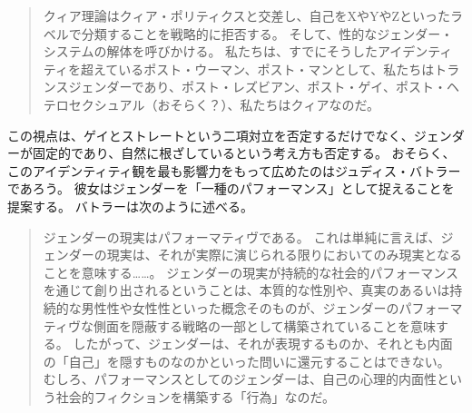 \documentclass[paper=a4,book,openany]{jlreq} \usepackage{mystyle}
\begin{document}
\begin{quote}
クィア理論はクィア・ポリティクスと交差し、自己をXやYやZといったラベルで分類することを戦略的に拒否する。
そして、性的なジェンダー・システムの解体を呼びかける。
私たちは、すでにそうしたアイデンティティを超えている{\DDASH}ポスト・ウーマン、ポスト・マンとして、私たちはトランスジェンダーであり、ポスト・レズビアン、ポスト・ゲイ、ポスト・ヘテロセクシュアル（おそらく？）、私たちはクィアなのだ。
\citep[p.38]{richardson00:_rethin_sexual}
\end{quote}

この視点は、ゲイとストレートという二項対立を否定するだけでなく、ジェンダーが固定的であり、自然に根ざしているという考え方も否定する。
おそらく、このアイデンティティ観を最も影響力をもって広めたのはジュディス・バトラーであろう。
彼女はジェンダーを「一種のパフォーマンス」として捉えることを提案する。
バトラーは次のように述べる。

\begin{quote}
ジェンダーの現実はパフォーマティヴである。
これは単純に言えば、ジェンダーの現実は、それが実際に演じられる限りにおいてのみ現実となることを意味する……。
ジェンダーの現実が持続的な社会的パフォーマンスを通じて創り出されるということは、本質的な性別や、真実のあるいは持続的な男性性や女性性といった概念そのものが、ジェンダーのパフォーマティヴな側面を隠蔽する戦略の一部として構築されていることを意味する。
したがって、ジェンダーは、それが表現するものか、それとも内面の「自己」を隠すものなのかといった問いに還元することはできない。
むしろ、パフォーマンスとしてのジェンダーは、自己の心理的内面性という社会的フィクションを構築する「行為」なのだ。\citep[pp. 527-528]{butler88:_perfor_acts_gender_const}

\end{quote}
\end{document}
